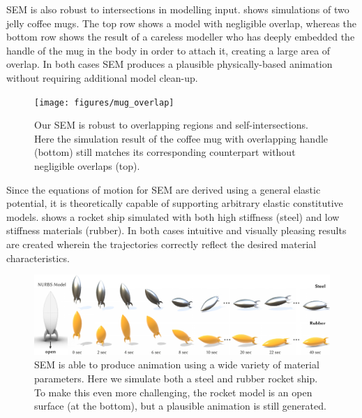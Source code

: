 SEM is also robust to intersections in modelling input.  shows simulations of two jelly coffee mugs. 
The top row shows a model with negligible overlap, whereas the bottom row shows the result of a careless modeller who has deeply embedded the handle of the mug in the body in order to attach it, creating a large area of overlap.
In both cases SEM produces a plausible physically-based animation without requiring additional model clean-up.

\begin{figure}[h]
  \texttt{[image: figures/mug\_overlap]}
  \caption{Our SEM is robust to overlapping regions and self-intersections. Here the simulation result of the coffee mug with overlapping handle (bottom) still matches its corresponding counterpart without negligible overlaps (top). }
  \label{fig:badmodels}
\end{figure}

Since the equations of motion for SEM are derived using a general elastic potential, it is theoretically capable of supporting arbitrary elastic constitutive models.
 shows a rocket ship simulated with both high stiffness (steel) and low stiffness materials (rubber). 
In both cases intuitive and visually pleasing results are created wherein the trajectories correctly reflect the desired material characteristics.  
\begin{figure}[htp]
  \includegraphics[width=\textwidth]{figures/rocket.pdf}
  \caption{SEM is able to produce animation using a wide variety of material parameters. Here we simulate both a steel and rubber rocket ship. 
  To make this even more challenging, the rocket model is an open surface (at the bottom), but a plausible animation is still generated.}
  \label{fig:rocket}
\end{figure}

